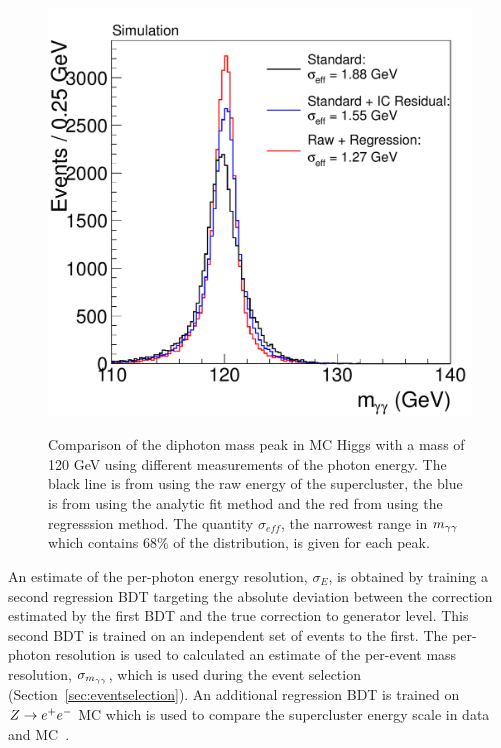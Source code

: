 \begin{figure}
\begin{center}
\includegraphics[width=.6\textwidth]{hgg7TeV/generalPlots/regrresall.pdf}
\label{fig:mcregrcomparison}
\caption{Comparison of the diphoton mass peak in MC Higgs with a mass of 120 GeV using different 
measurements of the photon energy. The black line 
is from using the raw energy of the supercluster, the blue is from using the analytic fit method 
and the red from using the regresssion method. The quantity $\sigma_{eff}$,
the narrowest range in $m_{\gamma\gamma}$ which contains 68\% of the distribution, is given for each peak.}
\end{center}
\end{figure}

An estimate of the per-photon energy resolution, $\sigma_{E}$, is obtained by training a second 
regression BDT targeting the absolute deviation between the correction estimated by the 
first BDT and the true correction to generator level. This second BDT is trained on an independent
set of events to the first. The per-photon resolution is used to calculated an estimate of the 
per-event mass resolution, $\sigma_{m_{\gamma\gamma}}$, which is used during the event selection 
(Section~\ref{sec:eventselection}). An additional regression BDT is trained on $Z\rightarrow e^{+}e^{-}$ MC which is used
to compare the supercluster energy scale in data and MC~\citep{AN-12-048}.

